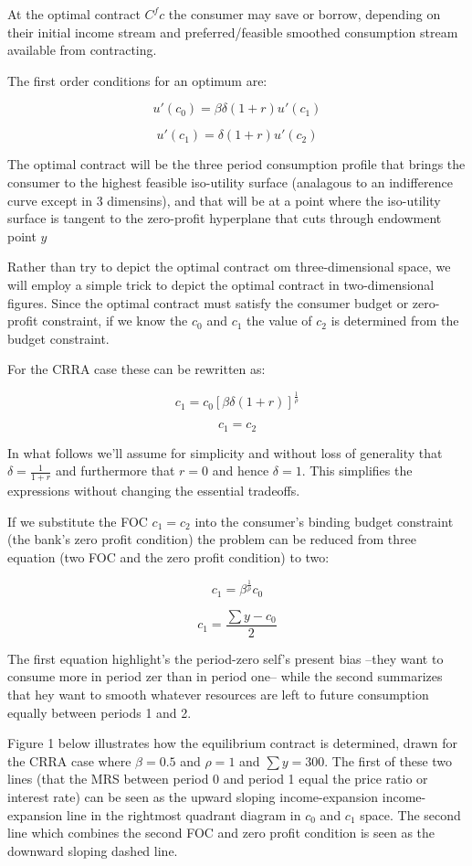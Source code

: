 \documentclass[11pt]{article}
\begin{document}
At the optimal contract \(C^fc\) the consumer may save or borrow,
depending on their initial income stream and preferred/feasible smoothed
consumption stream available from contracting.

    The first order conditions for an optimum are:

\[u'(c_0) = \beta \delta (1+r) u'(c_1)\]

\[u'(c_1) = \delta (1+r) u'(c_2)\]

    The optimal contract will be the three period consumption profile that
brings the consumer to the highest feasible iso-utility surface
(analagous to an indifference curve except in 3 dimensins), and that
will be at a point where the iso-utility surface is tangent to the
zero-profit hyperplane that cuts through endowment point \emph{\(y\)}

Rather than try to depict the optimal contract om three-dimensional
space, we will employ a simple trick to depict the optimal contract in
two-dimensional figures. Since the optimal contract must satisfy the
consumer budget or zero-profit constraint, if we know the \(c_0\) and
\(c_1\) the value of \(c_2\) is determined from the budget constraint.

    For the CRRA case these can be rewritten as:

\[c_1 = c_0 [ \beta \delta (1+r) ]^\frac{1}{\rho}\]

\[c_1 = c_2\]

    In what follows we'll assume for simplicity and without loss of
generality that \(\delta = \frac{1}{1+r}\) and furthermore that \(r=0\)
and hence \(\delta = 1\). This simplifies the expressions without
changing the essential tradeoffs.

If we substitute the FOC \(c_1=c_2\) into the consumer's binding budget
constraint (the bank's zero profit condition) the problem can be reduced
from three equation (two FOC and the zero profit condition) to two:

\[c_1 = \beta^\frac{1}{\rho} c_0\]

\[ c_1 = \frac{\sum y - c_0}{2}\]

    The first equation highlight's the period-zero self's present bias
--they want to consume more in period zer than in period one-- while the
second summarizes that hey want to smooth whatever resources are left to
future consumption equally between periods 1 and 2.

    Figure 1 below illustrates how the equilibrium contract is determined,
drawn for the CRRA case where \(\beta=0.5\) and \(\rho = 1\) and
\(\sum y =300\). The first of these two lines (that the MRS between
period 0 and period 1 equal the price ratio or interest rate) can be
seen as the upward sloping income-expansion income-expansion line in the
rightmost quadrant diagram in \(c_0\) and \(c_1\) space. The second line
which combines the second FOC and zero profit condition is seen as the
downward sloping dashed line.
\end{document}
